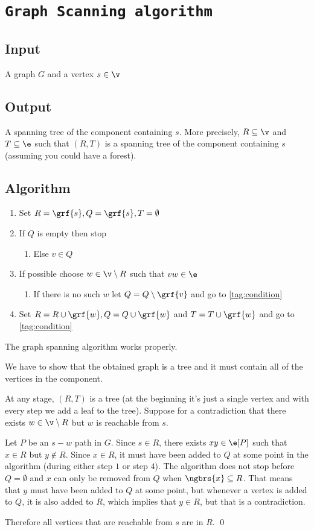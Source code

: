 \section{\texttt{Graph Scanning algorithm}}
\subsection{Input}
A graph $G$ and a vertex $s \in \v$
\subsection{Output}
A spanning tree of the component containing $s$. More precisely, $R \subseteq \v$ and $T \subseteq \e$ such that $(R, T)$ is a spanning tree of the component containing $s$ (assuming you could have a forest).
\subsection{Algorithm}
\begin{enumerate}
    \item Set $R = \grf{s}, Q = \grf{s}, T = \emptyset$
    \item \label{tag:condition} If $Q$ is empty then stop
    \begin{enumerate}
        \item Else $v \in Q$
    \end{enumerate}
    \item If possible choose $w \in \v \setminus R$ such that $vw \in \e$
    \begin{enumerate}
        \item If there is no such $w$ let $Q = Q \setminus \grf{v}$ and go to \ref{tag:condition}
    \end{enumerate}
    \item Set $R = R \cup \grf{w}, Q = Q \cup \grf{w}$ and $T = T \cup \grf{w}$ and go to \ref{tag:condition}
\end{enumerate}
\begin{customlemma}{1.18}
    \label{lemma:1.18}
    The graph spanning algorithm works properly.
\end{customlemma}
\begin{prf}
    We have to show that the obtained graph is a tree and it must contain all of the vertices in the component.

    At any stage, $(R, T)$ is a tree (at the beginning it's just a single vertex and with every step we add a leaf to the tree). Suppose for a contradiction that there exists $w \in \v \setminus R$ but $w$ is reachable from $s$.

    Let $P$ be an $s - w$ path in $G$. Since $s \in R$, there exists $xy \in \e[P]$ such that $x \in R$ but $y \notin R$. Since $x \in R$, it must have been added to $Q$ at some point in the algorithm (during either step $1$ or step $4$). The algorithm does not stop before $Q = \emptyset$ and $x$ can only be removed from $Q$ when $\ngbrs{x} \subseteq R$. That means that $y$ must have been added to $Q$ at some point, but whenever a vertex is added to $Q$, it is also added to $R$, which implies that $y \in R$, but that is a contradiction.

    Therefore all vertices that are reachable from $s$ are in $R$. \qed
\end{prf}
